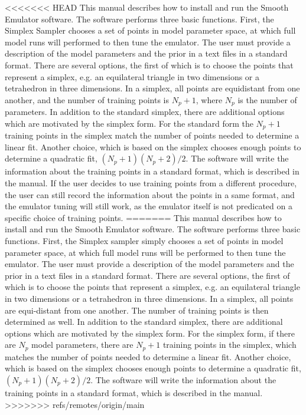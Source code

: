 \documentclass[12pt]{article}
\numberwithin{equation}{section}
\numberwithin{figure}{section}
\begin{document}
<<<<<<< HEAD
This manual describes how to install and run the Smooth Emulator software. The software performs three basic functions. First, the Simplex Sampler chooses a set of points in model parameter space, at which full model runs will performed to then tune the emulator. The user must provide a description of the model parameters and the prior in a text files in a standard format. There are several options, the first of which is to choose the points that represent a simplex, e.g. an equilateral triangle in two dimensions or a tetrahedron in three dimensions. In a simplex, all points are equidistant from one another, and the number of training points is $N_p+1$, where $N_p$ is the number of parameters. In addition to the standard simplex, there are additional options which are motivated by the simplex form. For the standard form the  $N_p+1$ training points in the simplex match the number of points needed to determine a linear fit. Another choice, which is based on the simplex chooses enough points to determine a quadratic fit, $(N_p+1)(N_p+2)/2$. The software will write the information about the training points in a standard format, which is described in the manual. If the user decides to use training points from a different procedure, the user can still record the information about the points in a same format, and the emulator tuning will still work, as the emulator itself is not predicated on a specific choice of training points.
=======
This manual describes how to install and run the Smooth Emulator software. The software performs three basic functions. First, the Simplex sampler simply chooses a set of points in model parameter space, at which full model runs will be performed to then tune the emulator. The user must provide a description of the model parameters and the prior in a text files in a standard format. There are several options, the first of which is to choose the points that represent a simplex, e.g. an equilateral triangle in two dimensions or a tetrahedron in three dimensions. In a simplex, all points are equi-distant from one another.  The number of training points is then determined as well. In addition to the standard simplex, there are additional options which are motivated by the simplex form. For the simplex form, if there are $N_p$ model parameters, there are $N_p+1$ training points in the simplex, which matches the number of points needed to determine a linear fit. Another choice, which is based on the simplex chooses enough points to determine a quadratic fit, $(N_p+1)(N_p+2)/2$. The software will write the information about the training points in a standard format, which is described in the manual.
>>>>>>> refs/remotes/origin/main
\end{document}
